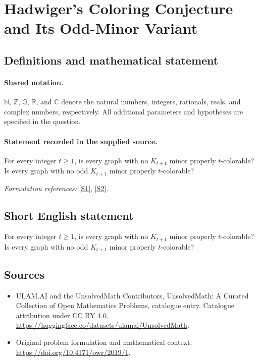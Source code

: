 \documentclass[11pt]{article}
\newcommand{\sref}[2]{\hyperlink{source:#1:#2}{[S#2]}}
\begin{document}
\section{Hadwiger’s Coloring Conjecture and Its Odd-Minor Variant}\label{statement}

\subsection{Definitions and mathematical statement}

\paragraph{Shared notation.}$\mathbb N$, $\mathbb Z$, $\mathbb Q$, $\mathbb R$, and $\mathbb C$ denote the natural numbers, integers, rationals, reals, and complex numbers, respectively. All additional parameters and hypotheses are specified in the question.


\paragraph{Statement recorded in the supplied source.}
For every integer $t\geq1$, is every graph with no $K_{t+1}$ minor properly $t$-colorable? Is every graph with no odd $K_{t+1}$ minor properly $t$-colorable?
\par\smallskip\textit{Formulation references:} \sref{statement}{1}, \sref{statement}{2}.
\subsection{Short English statement}
For every integer $t\geq1$, is every graph with no $K_{t+1}$ minor properly $t$-colorable? Is every graph with no odd $K_{t+1}$ minor properly $t$-colorable?
\subsection{Sources}
\begin{itemize}
\item[\hypertarget{source:statement:1}{S1}] ULAM.AI and the UnsolvedMath Contributors, UnsolvedMath: A Curated Collection of Open Mathematics Problems, catalogue entry. Catalogue attribution under CC BY 4.0.
\url{https://huggingface.co/datasets/ulamai/UnsolvedMath}.
\item[\hypertarget{source:statement:2}{S2}] Original problem formulation and mathematical context.
\url{https://doi.org/10.4171/owr/2019/1}.
\end{itemize}
\label{end:statement}
\end{document}
